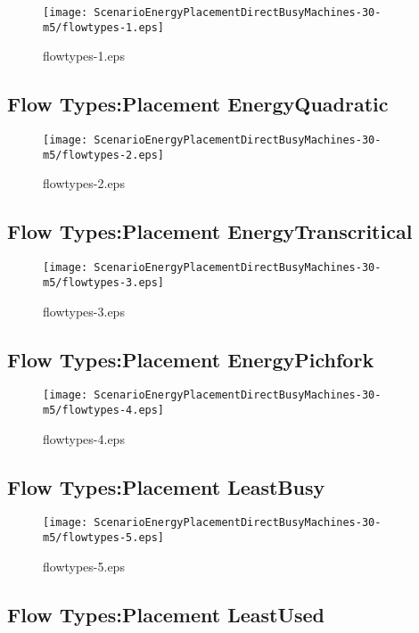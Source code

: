 \documentclass{elsart}
\begin{document}
\begin{figure}[ht]
\centering
\texttt{[image: ScenarioEnergyPlacementDirectBusyMachines-30-m5/flowtypes-1.eps]}
\caption{flowtypes-1.eps}\label{fig:flowtypes-1}
\end{figure}

\clearpage
\subsection{Flow Types:Placement EnergyQuadratic}

\begin{figure}[ht]
\centering
\texttt{[image: ScenarioEnergyPlacementDirectBusyMachines-30-m5/flowtypes-2.eps]}
\caption{flowtypes-2.eps}\label{fig:flowtypes-2}
\end{figure}

\clearpage
\subsection{Flow Types:Placement EnergyTranscritical}

\begin{figure}[ht]
\centering
\texttt{[image: ScenarioEnergyPlacementDirectBusyMachines-30-m5/flowtypes-3.eps]}
\caption{flowtypes-3.eps}\label{fig:flowtypes-3}
\end{figure}

\clearpage
\subsection{Flow Types:Placement EnergyPichfork}

\begin{figure}[ht]
\centering
\texttt{[image: ScenarioEnergyPlacementDirectBusyMachines-30-m5/flowtypes-4.eps]}
\caption{flowtypes-4.eps}\label{fig:flowtypes-4}
\end{figure}

\clearpage
\subsection{Flow Types:Placement LeastBusy}

\begin{figure}[ht]
\centering
\texttt{[image: ScenarioEnergyPlacementDirectBusyMachines-30-m5/flowtypes-5.eps]}
\caption{flowtypes-5.eps}\label{fig:flowtypes-5}
\end{figure}

\clearpage
\subsection{Flow Types:Placement LeastUsed}
\end{document}

